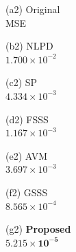 \documentclass[10pt,journal]{IEEEtran}
\theoremstyle{plain}
\begin{document}
\begin{figure}[!t]
\begin{center}
      \vspace{0.1cm}
      \begin{minipage}[t]{0.135\hsize}
        \centering \vspace*{-0.4cm} 
        \small{(a2) Original \\ MSE} \vspace*{0.1cm}
      \end{minipage} 
      \begin{minipage}[t]{0.135\hsize}
        \centering \vspace*{-0.4cm}
        \small{(b2) NLPD~\cite{Chen2015Discrete} \\ $1.700 \times 10^{-2}$} \vspace*{0.1cm}
      \end{minipage} 
      \begin{minipage}[t]{0.135\hsize}
        \centering \vspace*{-0.4cm}
        \small{(c2) SP~\cite{Anis2016Efficient} \\ $4.334 \times 10^{-3}$}
      \end{minipage} 
      \begin{minipage}[t]{0.135\hsize}
        \centering \vspace*{-0.4cm}
        \small{(d2) FSSS~\cite{Sakiyama2019Eigendecomposition} \\ $1.167 \times 10^{-3}$} \vspace*{0.1cm}
      \end{minipage} 
      \begin{minipage}[t]{0.135\hsize}
        \centering \vspace*{-0.4cm}
        \small{(e2) AVM~\cite{Jayawant2022Practical} \\ $3.697\times 10^{-3}$} \vspace*{0.1cm}
      \end{minipage} 
      \begin{minipage}[t]{0.135\hsize}
        \centering \vspace*{-0.4cm}
        \small{(f2) GSSS~\cite{Hara2022GSSS} \\ $8.565\times 10^{-4}$} \vspace*{0.1cm}
      \end{minipage} 
      \begin{minipage}[t]{0.135\hsize}
        \centering \vspace*{-0.4cm}
        \small{(g2) \textbf{Proposed\\$\mathbf{5.215\times 10^{-5}}$}} \vspace*{0.1cm}
      \end{minipage} 
      

\end{center}
\end{figure}
\end{document}
